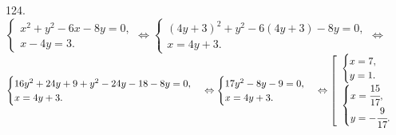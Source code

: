 124. $\begin{cases} x^2+y^2-6x-8y=0,\\ x-4y=3.\end{cases}\Leftrightarrow
\begin{cases} (4y+3)^2+y^2-6(4y+3)-8y=0,\\ x=4y+3.\end{cases}\Leftrightarrow$\\$
\begin{cases} 16y^2+24y+9+y^2-24y-18-8y=0,\\ x=4y+3.\end{cases}\Leftrightarrow
\begin{cases} 17y^2-8y-9=0,\\ x=4y+3.\end{cases}\Leftrightarrow
\left[\begin{array}{l}\begin{cases}x=7,\\y=1.\end{cases}\\
\begin{cases}x=\cfrac{15}{17},\\y=-\cfrac{9}{17}.\end{cases}\end{array}\right.$\\
